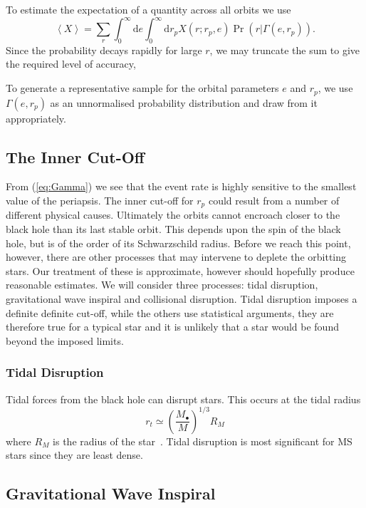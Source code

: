 \documentclass[useAMS,usedcolumn,usegraphicx,usenatbib]{mn2e}
\newcommand{\eqnref}[1]{(\ref{eq:#1})}
\newcommand{\dd}{\ensuremath{\mathrm{d}}}
\begin{document}
To estimate the expectation of a quantity across all orbits we use
\begin{equation}
\left\langle X\right\rangle = \sum_r \int_0^\infty \dd e \int_0^\infty \dd r_p X(r;r_p,e)\Pr(r|\Gamma(e, r_p)).
\end{equation}
Since the probability decays rapidly for large $r$, we may truncate the sum to give the required level of accuracy,

To generate a representative sample for the orbital parameters $e$ and $r_p$, we use $\Gamma(e, r_p)$ as an unnormalised probability distribution and draw from it appropriately.

\subsection{The Inner Cut-Off}

From \eqnref{Gamma} we see that the event rate is highly sensitive to the smallest value of the periapsis. The inner cut-off for $r_p$ could result from a number of different physical causes. Ultimately the orbits cannot encroach closer to the black hole than its last stable orbit. This depends upon the spin of the black hole, but is of the order of its Schwarzschild radius. Before we reach this point, however, there are other processes that may intervene to deplete the orbitting stars. Our treatment of these is approximate, however should hopefully produce reasonable estimates. We will consider three processes: tidal disruption, gravitational wave inspiral and collisional disruption. Tidal disruption imposes a definite definite cut-off, while the others use statistical arguments, they are therefore true for a typical star and it is unlikely that a star would be found beyond the imposed limits.

\subsubsection{Tidal Disruption}

Tidal forces from the black hole can disrupt stars. This occurs at the tidal radius
\begin{equation}
r_t \simeq \left(\frac{M_\bullet}{M}\right)^{1/3}R_M
\end{equation}
where $R_M$ is the radius of the star~\citep{Kobayashi2004}. Tidal disruption is most significant for MS stars since they are least dense.

\subsection{Gravitational Wave Inspiral}
\end{document}

